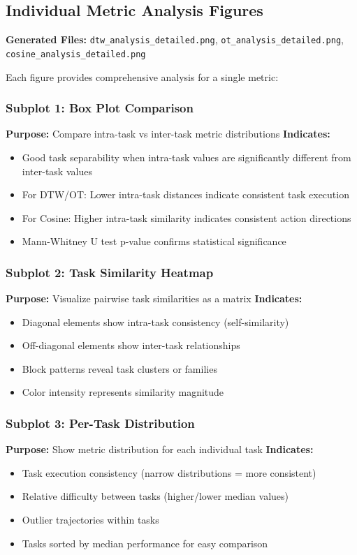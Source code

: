 \documentclass{article}
\begin{document}
\subsection{Individual Metric Analysis Figures}

\textbf{Generated Files:} \texttt{dtw\_analysis\_detailed.png}, \texttt{ot\_analysis\_detailed.png}, \texttt{cosine\_analysis\_detailed.png}

Each figure provides comprehensive analysis for a single metric:

\subsubsection{Subplot 1: Box Plot Comparison}
\textbf{Purpose:} Compare intra-task vs inter-task metric distributions
\textbf{Indicates:} 
\begin{itemize}
    \item Good task separability when intra-task values are significantly different from inter-task values
    \item For DTW/OT: Lower intra-task distances indicate consistent task execution
    \item For Cosine: Higher intra-task similarity indicates consistent action directions
    \item Mann-Whitney U test p-value confirms statistical significance
\end{itemize}

\subsubsection{Subplot 2: Task Similarity Heatmap}
\textbf{Purpose:} Visualize pairwise task similarities as a matrix
\textbf{Indicates:}
\begin{itemize}
    \item Diagonal elements show intra-task consistency (self-similarity)
    \item Off-diagonal elements show inter-task relationships
    \item Block patterns reveal task clusters or families
    \item Color intensity represents similarity magnitude
\end{itemize}

\subsubsection{Subplot 3: Per-Task Distribution}
\textbf{Purpose:} Show metric distribution for each individual task
\textbf{Indicates:}
\begin{itemize}
    \item Task execution consistency (narrow distributions = more consistent)
    \item Relative difficulty between tasks (higher/lower median values)
    \item Outlier trajectories within tasks
    \item Tasks sorted by median performance for easy comparison
\end{itemize}
\end{document}
